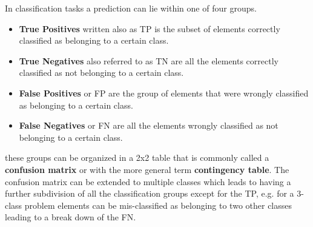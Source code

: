 In classification tasks a prediction can lie within one of four groups.
\begin{itemize}
    \item \textbf{True Positives} written also as TP is the subset of elements correctly classified as belonging to a certain class.
    \item \textbf{True Negatives} also referred to as TN are all the elements correctly classified as not belonging to a certain class.
    \item \textbf{False Positives} or FP are the group of elements that were wrongly classified as belonging to a certain class.
    \item \textbf{False Negatives} or FN are all the elements wrongly classified as not belonging to a certain class.
\end{itemize}
these groups can be organized in a 2x2 table that is commonly called a \textbf{confusion matrix} or with the more general term \textbf{contingency table}. The confusion matrix can be extended to multiple classes which leads to having a further subdivision of all the classification groups except for the TP, e.g. for a 3-class problem elements can be mis-classified as belonging to two other classes leading to a break down of the FN.

